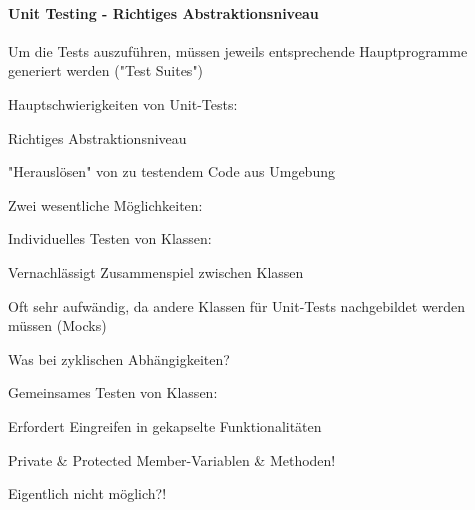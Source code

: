 \documentclass[10pt]{article}
\begin{document}
\paragraph{Unit Testing - Richtiges Abstraktionsniveau}
\begin{itemize*}
  \item Um die Tests auszuführen, müssen jeweils entsprechende Hauptprogramme generiert werden ("Test Suites")
  \item Hauptschwierigkeiten von Unit-Tests:
  \begin{itemize*}
    \item Richtiges Abstraktionsniveau
    \item "Herauslösen" von zu testendem Code aus Umgebung
  \end{itemize*}
  \item Zwei wesentliche Möglichkeiten:
  \begin{itemize*}
    \item Individuelles Testen von Klassen:
    \begin{itemize*}
      \item Vernachlässigt Zusammenspiel zwischen Klassen
      \item Oft sehr aufwändig, da andere Klassen für Unit-Tests nachgebildet werden müssen (Mocks)
      \item Was bei zyklischen Abhängigkeiten?
    \end{itemize*}
    \item Gemeinsames Testen von Klassen:
    \begin{itemize*}
      \item Erfordert Eingreifen in gekapselte Funktionalitäten
      \item Private \& Protected Member-Variablen \& Methoden!
      \item Eigentlich nicht möglich?!
    \end{itemize*}
  \end{itemize*}
\end{itemize*}
\end{document}
